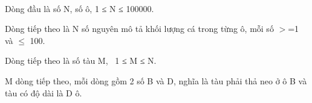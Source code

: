  

Dòng đầu là số N, số ô, 1 ≤ N ≤ 100000.

Dòng tiếp theo là N số nguyên mô tả khối lượng cá trong từng ô, mỗi số $>$=1 và  $\le$ 100.

Dòng tiếp theo là số tàu M,  1 ≤ M ≤ N.

M dòng tiếp theo, mỗi dòng gồm 2 số B và D, nghĩa là tàu phải thả neo ở ô B và tàu có độ dài là D ô.

 